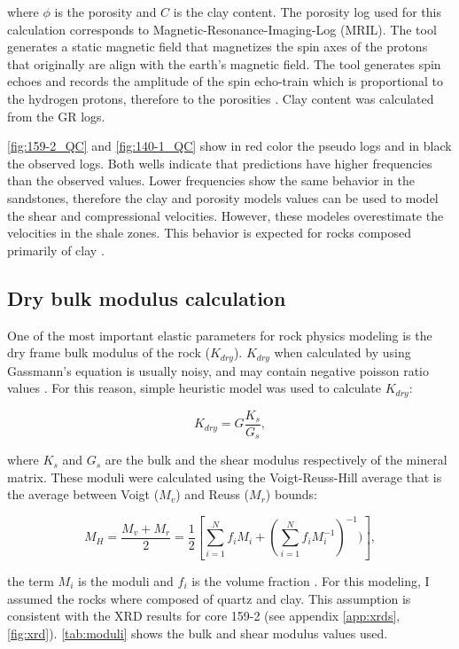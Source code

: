 where $\phi$ is the porosity and $C$ is the clay content. The porosity log used for 
this calculation corresponds to Magnetic-Resonance-Imaging-Log (MRIL). The
tool generates a static magnetic field that magnetizes the spin axes of the protons that 
originally are align with the earth's magnetic field. The tool generates spin echoes
and records the amplitude of the spin echo-train which is proportional to the hydrogen 
protons, therefore to the porosities \citep{ref:george}. Clay content was calculated from
the GR logs.

\ref{fig:159-2_QC} and \ref{fig:140-1_QC} show in red color the pseudo logs and in black the
observed logs. Both wells indicate that predictions have higher frequencies than the
observed values. Lower frequencies show the same behavior in the sandstones, therefore the clay and porosity models
values can be used to model the shear and compressional velocities. However, these modeles overestimate the 
velocities in the shale zones. This behavior is expected for rocks composed primarily of clay \citep{ref:castagna}.  

\subsection{Dry bulk modulus calculation}
\label{sec:drybulk}
One of the most important elastic parameters for rock physics modeling 
is the dry frame bulk modulus of the rock ($K_{dry}$). $K_{dry}$ when calculated by 
using Gassmann's equation is usually noisy, and may contain negative poisson
ratio values \citep{ref:tad}. For this reason, \cite{ref:krief} simple heuristic model
was used to calculate $K_{dry}$:

\begin{equation}
K_{dry}=G \frac{K_{s}}{G_{s}},
  \label{eq:kdry}
\end{equation}

where $K_{s}$ and $G_{s}$ are the bulk and the shear modulus respectively of the mineral matrix. These moduli
were calculated using the Voigt-Reuss-Hill average that is the average between Voigt ($M_{v}$)
and Reuss ($M_{r}$) bounds:

\begin{equation}
M_{H}= \frac{M_{v}+M_{r}}{2}=\frac{1}{2}[\sum_{i=1}^{N}f_{i}M_{i}+(\sum_{i=1}^{N}f_{i}M_{i}^{-1})^{-1})],
  \label{eq:hill}
\end{equation}

the term $M_{i}$ is the moduli and $f_{i}$ is the volume fraction \citep{ref:handbook}. For this modeling,
I assumed the rocks where composed of quartz and clay. This assumption is consistent with the XRD results 
for core 159-2 (see appendix \ref{app:xrds}, \ref{fig:xrd}). \ref{tab:moduli}  shows the bulk and shear modulus values used. 
 
